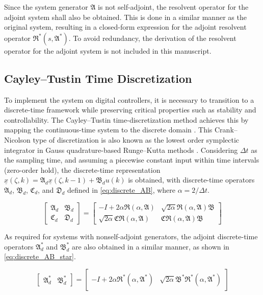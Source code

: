 Since the system generator $\mathfrak{A}$ is not self-adjoint, the resolvent operator for the adjoint system shall also be obtained. This is done in a similar manner as the original system, resulting in a closed-form expression for the adjoint resolvent operator $\mathfrak{R}^*(s, \mathfrak{A}^*)$. %
To avoid redundancy, the derivation of the resolvent operator for the adjoint system is not included in this manuscript.

\subsection{Cayley–Tustin Time Discretization}

To implement the system on digital controllers, it is necessary to transition to a discrete-time framework while preserving critical properties such as stability and controllability. The Cayley–Tustin time-discretization method achieves this by mapping the continuous-time system to the discrete domain \cite{havu2007cayley, xu2017linear}. This Crank–Nicolson type of discretization is also known as the lowest order symplectic integrator in Gauss quadrature-based Runge–Kutta methods \cite{hairer2006geometric}. Considering $\Delta t$ as the sampling time, and assuming a piecewise constant input within time intervals (zero-order hold), the discrete-time representation $\underline{x}(\zeta, k) = \mathfrak{A}_d \underline{x}(\zeta, k-1) + \mathfrak{B}_d u(k)$ is obtained, with discrete-time operators $\mathfrak{A}_d$, $\mathfrak{B}_d$, $\mathfrak{C}_d$, and $\mathfrak{D}_d$ defined in \eqref{eq:discrete_AB}, where $\alpha = 2/{\Delta t}$.

\begin{equation} \label{eq:discrete_AB}
    \begin{bmatrix}
        \mathfrak{A}_d & \mathfrak{B}_d \\
        \mathfrak{C}_d & \mathfrak{D}_d
    \end{bmatrix} = 
    \begin{bmatrix}
        -I + 2\alpha \mathfrak{R}(\alpha, \mathfrak{A}) & \sqrt{2\alpha} \mathfrak{R}(\alpha, \mathfrak{A}) \mathfrak{B} \\
        \sqrt{2\alpha} \mathfrak{C} \mathfrak{R}(\alpha, \mathfrak{A}) & \mathfrak{C} \mathfrak{R}(\alpha, \mathfrak{A}) \mathfrak{B}
    \end{bmatrix}
\end{equation}

As required for systems with nonself-adjoint generators, the adjoint discrete-time operators $\mathfrak{A}_d^*$ and $\mathfrak{B}_d^*$ are also obtained in a similar manner, as shown in \eqref{eq:discrete_AB_star}.

\begin{equation} \label{eq:discrete_AB_star}
    \begin{bmatrix}
        \mathfrak{A}_d^* & \mathfrak{B}_d^*
    \end{bmatrix} = 
    \begin{bmatrix}
        -I + 2\alpha \mathfrak{R}^*(\alpha, \mathfrak{A}^*) & \sqrt{2\alpha} \mathfrak{B}^* \mathfrak{R}^*(\alpha, \mathfrak{A}^*)
    \end{bmatrix}
\end{equation}
